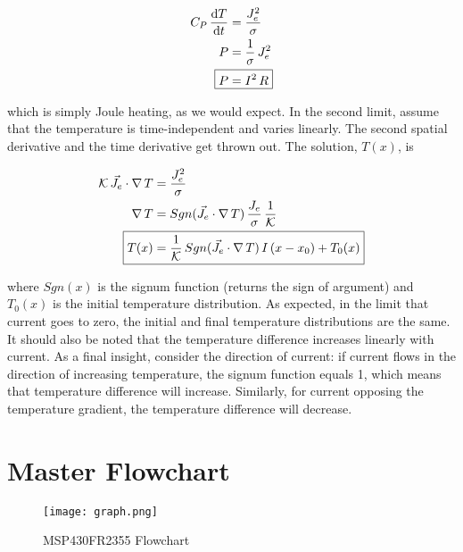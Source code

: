 \documentclass{article}
\begin{document}
\begin{align}
\label{eq:JouleHeatingLimit}
	C_P \, \frac{\mathrm{d}T}{\mathrm{d}t} &= \frac{J_e^2}{\sigma} \notag \\
	P &= \frac{1}{\sigma} \, J_e^2 \notag \\
	\Aboxed{P &= I^2 \, R}
\end{align}

\noindent which is simply Joule heating, as we would expect. In the second limit, assume that the temperature is time-independent and varies linearly. The second spatial derivative and the time derivative get thrown out. The solution, \(T(x)\), is

\begin{align}
\label{eq:LinearTemp}
	\mathcal{K} \, \vec{J}_e \cdot \nabla \, T &= \frac{J_e^2}{\sigma} \notag \\
\;
	\nabla \, T &= Sgn(\vec{J}_e \cdot \nabla \, T) \, \frac{J_e}{\sigma} \, \frac{1}{\mathcal{K}} \notag \\
\;
	\Aboxed{T(x) &= \frac{1}{\mathcal{K}} \, Sgn(\vec{J}_e \cdot \nabla \, T) \, I \, (x - x_0) + T_0(x)}
\end{align}

\noindent where \(Sgn(x)\) is the signum function (returns the sign of argument) and \(T_0(x)\) is the initial temperature distribution. As expected, in the limit that current goes to zero, the initial and final temperature distributions are the same. It should also be noted that the temperature difference increases linearly with current. As a final insight, consider the direction of current: if current flows in the direction of increasing temperature, the signum function equals 1, which means that temperature difference will increase. Similarly, for current opposing the temperature gradient, the temperature difference will decrease.\\


\section{Master Flowchart}
\label{app:MasterFlowchart}

\begin{centering}
\begin{figure}[H]
\centering
\texttt{[image: graph.png]}
\captionsetup{format = hang, width = 0.75\textwidth}
\caption{MSP430FR2355 Flowchart}
\label{fig:Flowchart}
\end{figure}
\end{centering}
\end{document}
